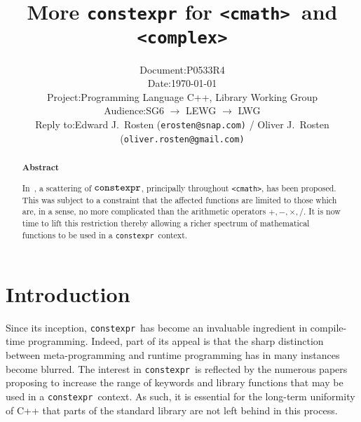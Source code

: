 \documentclass[prd,twocolumn,amsmath,amssymb,nofootinbib,eqsecnum]{revtex4-1}
\newcommand{\constexpr}{\code{constexpr}\xspace}
\newcommand{\code}[1]{{\tt #1}}
\newcommand{\header}[1]{{\tt <#1>}}
\newcommand{\cmath}{\header{cmath}}
\newcommand{\complex}{\header{complex}}
\newcommand{\Operators}{\ensuremath{+,-,\times,/}}
\begin{document}
\title{More \constexpr for \cmath\ and \complex}

\author{
\hspace{11.5em}
\begin{tabular}{ll}
	Document: & P0533R4
\\
	Date: & \today
\\
	Project: & Programming Language C++, Library Working Group
\\
	Audience: & SG6 $\rightarrow$ LEWG $\rightarrow$ LWG
\\
	Reply to: & Edward J.\ Rosten {(\tt erosten@snap.com)}
 / Oliver J.\ Rosten {(\tt oliver.rosten@gmail.com)}
\end{tabular}
}

\begin{abstract}

\begin{center} {\bf Abstract} \end{center}

In~\cite{Rosten-constexpr}, a scattering of $\constexpr$, principally throughout \cmath, has been proposed. This was subject to a constraint that the affected functions are limited to those which are, in a sense, no more complicated than the arithmetic operators \Operators. It is now time to lift this restriction thereby allowing a richer spectrum of mathematical functions to be used in a \constexpr\ context.
	
\end{abstract}


\maketitle

\tableofcontents

\section{Introduction}

Since its inception, \constexpr\ has become an invaluable ingredient in compile-time programming. Indeed, part of its appeal is that the sharp distinction between meta-programming and runtime programming has in many instances become blurred. The interest in \constexpr\ is reflected by the numerous papers proposing to increase the range of keywords and library functions that may be used in a \constexpr\ context. As such, it is essential for the long-term uniformity of C++ that parts of the standard library are not left behind in this process.
\end{document}
